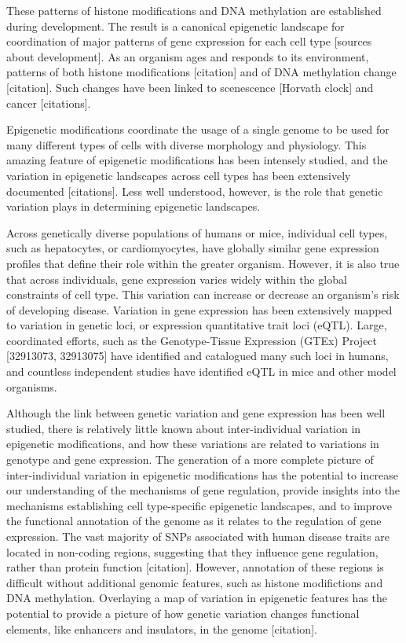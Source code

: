 \documentclass[10pt,letterpaper]{article}
\begin{document}
These patterns of histone modifications and DNA methylation are
established during development. The result is a canonical epigenetic
landscape for coordination of major patterns of gene expression for each
cell type {[}sources about development{]}. As an organism ages and
responds to its environment, patterns of both histone modifications
{[}citation{]} and of DNA methylation change {[}citation{]}. Such
changes have been linked to scenescence {[}Horvath clock{]} and cancer
{[}citations{]}.

Epigenetic modifications coordinate the usage of a single genome to be
used for many different types of cells with diverse morphology and
physiology. This amazing feature of epigenetic modifications has been
intensely studied, and the variation in epigenetic landscapes across
cell types has been extensively documented {[}citations{]}. Less well
understood, however, is the role that genetic variation plays in
determining epigenetic landscapes.

Across genetically diverse populations of humans or mice, individual
cell types, such as hepatocytes, or cardiomyocytes, have globally
similar gene expression profiles that define their role within the
greater organism. However, it is also true that across individuals, gene
expression varies widely within the global constraints of cell type.
This variation can increase or decrease an organism's risk of developing
disease. Variation in gene expression has been extensively mapped to
variation in genetic loci, or expression quantitative trait loci (eQTL).
Large, coordinated efforts, such as the Genotype-Tissue Expression
(GTEx) Project {[}32913073, 32913075{]} have identified and catalogued
many such loci in humans, and countless independent studies have
identified eQTL in mice and other model organisms.

Although the link between genetic variation and gene expression has been
well studied, there is relatively little known about inter-individual
variation in epigenetic modifications, and how these variations are
related to variations in genotype and gene expression. The generation of
a more complete picture of inter-individual variation in epigenetic
modifications has the potential to increase our understanding of the
mechanisms of gene regulation, provide insights into the mechanisms
establishing cell type-specific epigenetic landscapes, and to improve
the functional annotation of the genome as it relates to the regulation
of gene expression. The vast majority of SNPs associated with human
disease traits are located in non-coding regions, suggesting that they
influence gene regulation, rather than protein function {[}citation{]}.
However, annotation of these regions is difficult without additional
genomic features, such as histone modifictions and DNA methylation.
Overlaying a map of variation in epigenetic features has the potential
to provide a picture of how genetic variation changes functional
elements, like enhancers and insulators, in the genome {[}citation{]}.
\end{document}
